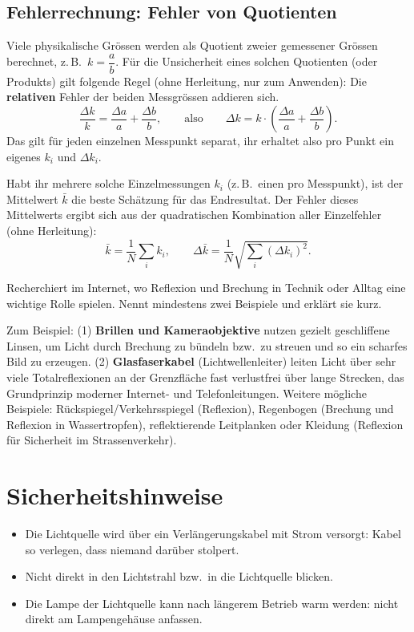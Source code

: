 \documentclass[11pt,a4paper]{article}
\newcommand{\zeichenraum}[1][4.5cm]{%
  \par\vspace{4pt}\noindent
  \fbox{\begin{minipage}[t][#1][t]{\dimexpr\linewidth-2\fboxsep-2\fboxrule}\ \end{minipage}}
  \vspace{4pt}
}
\begin{document}
\subsection{Fehlerrechnung: Fehler von Quotienten}
\label{sec:fehlerrechnung}
Viele physikalische Grössen werden als Quotient zweier gemessener Grössen berechnet, z.\,B.\ $k=\dfrac{a}{b}$. Für die Unsicherheit eines solchen Quotienten (oder Produkts) gilt folgende Regel (ohne Herleitung, nur zum Anwenden): Die \textbf{relativen} Fehler der beiden Messgrössen addieren sich.
\[
  \frac{\Delta k}{k} = \frac{\Delta a}{a} + \frac{\Delta b}{b}, \qquad \text{also} \qquad \Delta k = k\cdot\left(\frac{\Delta a}{a}+\frac{\Delta b}{b}\right).
\]
Das gilt für jeden einzelnen Messpunkt separat, ihr erhaltet also pro Punkt ein eigenes $k_i$ und $\Delta k_i$.

Habt ihr mehrere solche Einzelmessungen $k_i$ (z.\,B.\ einen pro Messpunkt), ist der Mittelwert $\bar k$ die beste Schätzung für das Endresultat. Der Fehler dieses Mittelwerts ergibt sich aus der quadratischen Kombination aller Einzelfehler (ohne Herleitung):
\[
  \bar k = \frac{1}{N}\sum_i k_i, \qquad \Delta \bar k = \frac{1}{N}\sqrt{\sum_i (\Delta k_i)^2}.
\]

\begin{aufgabebox}
Recherchiert im Internet, wo Reflexion und Brechung in Technik oder Alltag eine wichtige Rolle spielen. Nennt mindestens zwei Beispiele und erklärt sie kurz.
\end{aufgabebox}
\zeichenraum[4.8cm]
\begin{solution}
\begin{loesungbox}
Zum Beispiel: (1) \textbf{Brillen und Kameraobjektive} nutzen gezielt geschliffene Linsen, um Licht durch Brechung zu bündeln bzw.\ zu streuen und so ein scharfes Bild zu erzeugen. (2) \textbf{Glasfaserkabel} (Lichtwellenleiter) leiten Licht über sehr viele Totalreflexionen an der Grenzfläche fast verlustfrei über lange Strecken, das Grundprinzip moderner Internet- und Telefonleitungen. Weitere mögliche Beispiele: Rückspiegel/Verkehrsspiegel (Reflexion), Regenbogen (Brechung und Reflexion in Wassertropfen), reflektierende Leitplanken oder Kleidung (Reflexion für Sicherheit im Strassenverkehr).
\end{loesungbox}
\end{solution}

\section{Sicherheitshinweise}
\begin{itemize}
  \item Die Lichtquelle wird über ein Verlängerungskabel mit Strom versorgt: Kabel so verlegen, dass niemand darüber stolpert.
  \item Nicht direkt in den Lichtstrahl bzw.\ in die Lichtquelle blicken.
  \item Die Lampe der Lichtquelle kann nach längerem Betrieb warm werden: nicht direkt am Lampengehäuse anfassen.
\end{itemize}
\end{document}
